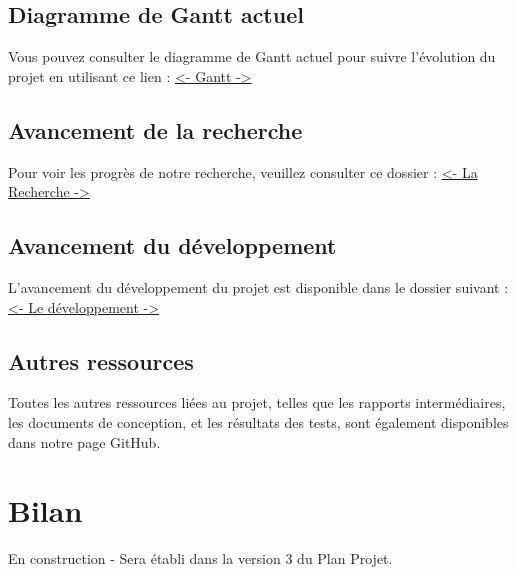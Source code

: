 \documentclass[11pt]{rapport_class}
\begin{document}
\section{Diagramme de Gantt actuel}
Vous pouvez consulter le diagramme de Gantt actuel pour suivre l'évolution du projet en utilisant ce lien :
\href{https://github.com/fghjklm/Projet_M1_CheckThat-/tree/main/gantt}{<- Gantt ->}

\section{Avancement de la recherche}
Pour voir les progrès de notre recherche, veuillez consulter ce dossier :
\href{https://github.com/fghjklm/Projet_M1_CheckThat-/tree/main/articles}{<- La Recherche ->}

\section{Avancement du développement}
L'avancement du développement du projet est disponible dans le dossier suivant :
\href{https://github.com/fghjklm/Projet_M1_CheckThat-/tree/main/code}{<- Le développement ->}

\section{Autres ressources}
Toutes les autres ressources liées au projet, telles que les rapports intermédiaires, les documents de conception, et les résultats des tests, sont également disponibles dans notre page GitHub.


\chapter{Bilan}
\centerline{En construction - Sera établi dans la version 3 du Plan Projet.}
\end{document}
